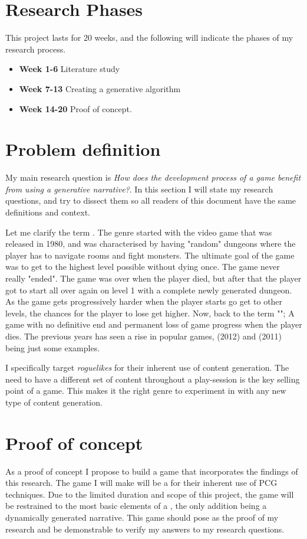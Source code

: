 \section{Research Phases}
This project lasts for 20 weeks, and the following will indicate the phases of my research process.

\begin{itemize}
	\item \textbf{Week 1-6} Literature study
	\item \textbf{Week 7-13} Creating a generative algorithm
	\item \textbf{Week 14-20} Proof of concept.
\end{itemize}

\section{Problem definition}
My main research question is \textit{How does the development process of a \rogue game benefit from using a generative narrative?}. In this section I will state my research questions, and try to dissect them so all readers of this document have the same definitions and context.
	
Let me clarify the term \rogue. The genre started with the video game  that was released in 1980, and was characterised by having "random" dungeons where the player has to navigate rooms and fight monsters. The ultimate goal of the game was to get to the highest level possible without dying once. The game never really "ended". The game was over when the player died, but after that the player got to start all over again on level 1 with a complete newly generated dungeon. As the game gets progressively harder when the player starts go get to other levels, the chances for the player to lose get higher. Now, back to the term "\rogue"; A game with no definitive end and permanent loss of game progress when the player dies. The previous years has seen a rise in popular \rogue games,  (2012) and  (2011) being just some examples.

I specifically target \textit{roguelikes} for their inherent use of content generation. The need to have a different set of content throughout a play-session is the key selling point of a \rogue game. This makes it the right genre to experiment in with any new type of content generation.
\section{Proof of concept}
As a proof of concept I propose to build a game that incorporates the findings of this research. The game I will make will be a \rogue for their inherent use of PCG techniques. Due to the limited duration and scope of this project, the game will be restrained to the most basic elements of a \rogue, the only addition being a dynamically generated narrative. This game should pose as the proof of my research and be demonstrable to verify my answers to my research questions.
